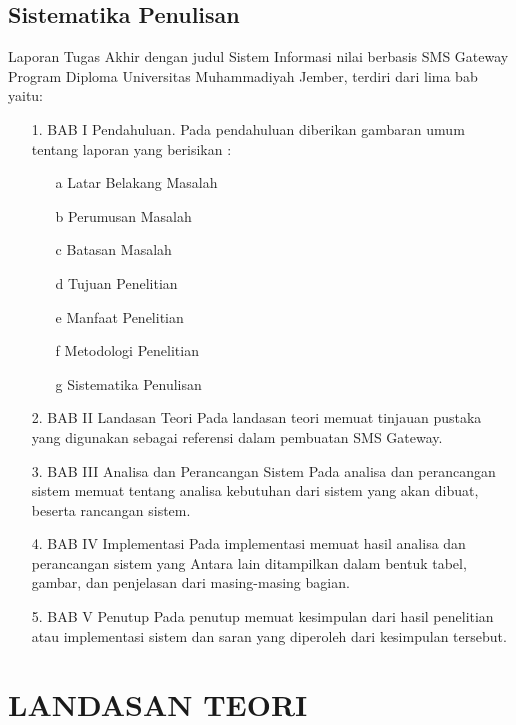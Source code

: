 \documentclass{jtetiproposalskripsi}
\begin{document}
\section{Sistematika Penulisan}
Laporan  Tugas  Akhir  dengan  judul  Sistem  Informasi  nilai  berbasis  SMS Gateway Program Diploma Universitas Muhammadiyah Jember, terdiri dari lima bab yaitu: 
\begin{itemize}
\item[1.]BAB I Pendahuluan.
Pada pendahuluan diberikan gambaran umum tentang laporan yang berisikan :
\begin{itemize}
\item[a] Latar Belakang Masalah 
\item[b]Perumusan Masalah 
\item[c]Batasan Masalah 
\item[d]Tujuan Penelitian 
\item[e]Manfaat Penelitian 
\item[f]Metodologi Penelitian 
\item[g]Sistematika Penulisan 
\end{itemize}
\item[2.]BAB II Landasan Teori 
Pada  landasan  teori  memuat  tinjauan  pustaka  yang  digunakan  sebagai referensi dalam pembuatan SMS Gateway. 
\item[3.]BAB III Analisa dan Perancangan Sistem
Pada  analisa  dan  perancangan  sistem  memuat  tentang  analisa  kebutuhan dari sistem yang akan dibuat, beserta rancangan sistem. 
\item[4.]BAB IV Implementasi 
Pada  implementasi  memuat  hasil  analisa  dan  perancangan  sistem  yang Antara lain   ditampilkan   dalam   bentuk   tabel,   gambar,   dan   penjelasan   dari masing-masing bagian.
\item[5.]BAB V Penutup
Pada penutup memuat   kesimpulan dari hasil penelitian atau implementasi sistem dan saran yang diperoleh dari kesimpulan tersebut.  

\end{itemize}



\chapter{LANDASAN TEORI}                
\end{document}
